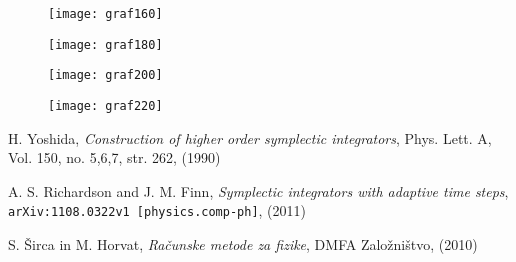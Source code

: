 \documentclass[12pt, a4paper]{article}
\begin{document}
\begin{figure}[H]\centering
	\texttt{[image: graf160]}
	\caption{}
\end{figure}

\begin{figure}[H]\centering
	\texttt{[image: graf180]}
	\caption{}
\end{figure}

\begin{figure}[H]\centering
	\texttt{[image: graf200]}
	\caption{}
\end{figure}

\begin{figure}[H]\centering
	\texttt{[image: graf220]}
	\caption{}
\end{figure}

\begin{thebibliography}{9}
        H. Yoshida,
        \emph{Construction of higher order symplectic integrators},
        Phys. Lett. A,
        Vol. 150, no. 5,6,7, str. 262,
        (1990)

        A. S. Richardson and J. M. Finn,
        \emph{Symplectic integrators with adaptive time steps},
        {\tt arXiv:1108.0322v1 [physics.comp-ph]},
        (2011)

        S. \v Sirca in M. Horvat,
        {\em Ra\v cunske metode za fizike},
        DMFA Zalo\v zni\v stvo,
        (2010)
\end{thebibliography}
\end{document}
